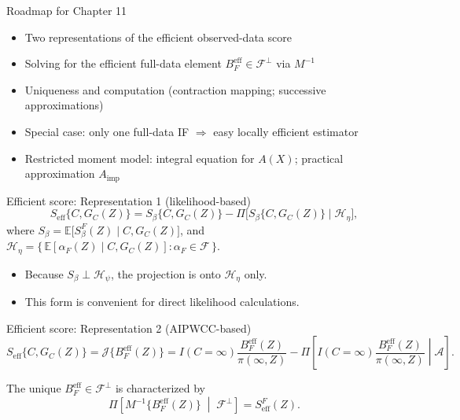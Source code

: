 \documentclass[xcolor=dvipsnames,aspectratio=169]{beamer}
\newcommand{\E}{\mathbb{E}}
\newcommand{\1}{\mathbbm{1}}
\begin{document}
\begin{frame}{Roadmap for Chapter 11}
  \begin{itemize}
    \item Two representations of the efficient observed-data score
    \item Solving for the efficient full-data element $B_F^{\text{eff}}\in\mathcal{F}^{\perp}$ via $M^{-1}$
    \item Uniqueness and computation (contraction mapping; successive approximations)
    \item Special case: only one full-data IF $\Rightarrow$ easy locally efficient estimator
    \item Restricted moment model: integral equation for $A(X)$; practical approximation $A_{\text{imp}}$
  \end{itemize}
\end{frame}

\begin{frame}{Efficient score: Representation 1 (likelihood-based)}
  \[
    S_{\text{eff}}\{C,G_C(Z)\}=S_\beta\{C,G_C(Z)\}-\Pi\big[S_\beta\{C,G_C(Z)\}\mid \mathcal{H}_\eta\big],
  \]
  where $S_\beta=\E\big[S^F_\beta(Z)\mid C,G_C(Z)\big]$, and $\mathcal{H}_\eta=\{\,\E[\alpha_F(Z)\mid C,G_C(Z)]:\alpha_F\in\mathcal{F}\,\}$.
  \begin{itemize}
    \item Because $S_\beta\perp \mathcal{H}_\psi$, the projection is onto $\mathcal{H}_\eta$ only.
    \item This form is convenient for direct likelihood calculations.
  \end{itemize}
\end{frame}

\begin{frame}{Efficient score: Representation 2 (AIPWCC-based)}
  \[
    S_{\text{eff}}\{C,G_C(Z)\}=\mathcal{J}\big\{B_F^{\text{eff}}(Z)\big\}
    =I(C=\infty)\frac{B_F^{\text{eff}}(Z)}{\pi(\infty,Z)}-\Pi\!\left[I(C=\infty)\frac{B_F^{\text{eff}}(Z)}{\pi(\infty,Z)}\middle|\mathcal{A}\right].
  \]
  \begin{tcolorbox}[title=Bridge]
    The unique $B_F^{\text{eff}}\in\mathcal{F}^{\perp}$ is characterized by
    \[
      \Pi\!\left[M^{-1}\{B_F^{\text{eff}}(Z)\}\;\middle|\;\mathcal{F}^{\perp}\right]=S^{F}_{\text{eff}}(Z).
    \]
  \end{tcolorbox}
\end{frame}
\end{document}
